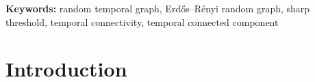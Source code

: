 \documentclass[a4paper,11pt]{article}
\theoremstyle{definition}
\theoremstyle{plain}
\newcommand{\ie}{i.e.,\xspace}
\newcommand{\Erdos}{Erd\H{o}s}
\newcommand{\Renyi}{R\'enyi}
\newcommand{\ER}{\Erdos-\Renyi}
\begin{document}
\begin{abstract}
	
%  
%  
%
\end{abstract}


{
\textbf{Keywords: }
{random temporal graph, Erd{\H{o}}s–R{\'e}nyi random graph, sharp threshold, temporal connectivity, temporal connected component}
}

\section{Introduction}
\end{document}
